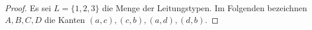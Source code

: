 \documentclass[a4paper]{scrartcl}
\begin{document}
\begin{enumerate}[label=\bfseries\arabic*.]
%                   
%                  
%
%

                \begin{proof}
                    Es sei $L = \{1, 2, 3\}$ die Menge der Leitungstypen.
                    Im Folgenden bezeichnen $A, B, C, D$ die Kanten
                    $(a, c), (c, b), (a, d), (d, b)$.


\end{proof}
\end{enumerate}
\end{document}
